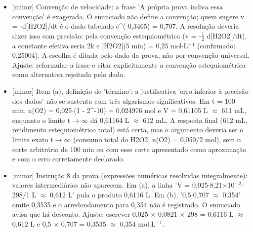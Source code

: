 \documentclass{article}%
\begin{document}
\begin{itemize}%
\item%
{[}minor{]} Convenção de velocidade: a frase 'A própria prova indica essa convenção' é exagerada. O enunciado não define a convenção; quem sugere v = -d{[}H2O2{]}/dt é o dado tabelado e\^{}(-0,3465) = 0,707. A resolução deveria dizer isso com precisão: pela convenção estequiométrica (v = -$\frac12$ d{[}H2O2{]}/dt), a constante efetiva seria 2k e {[}H2O2{]}(5 min) = 0,25 mol$\cdot$L$^{-}$$^{1}$ (confirmado: 0,25004). A escolha é ditada pelo dado da prova, não por convenção universal. Ajuste: reformular a frase e citar explicitamente a convenção estequiométrica como alternativa rejeitada pelo dado.%
\item%
{[}minor{]} Item (a), definição de 'término': a justificativa 'erro inferior à precisão dos dados' não se sustenta com três algarismos significativos. Em t = 100 min, n(O2) = 0,025$\cdot$(1 - 2\^{}-10) = 0,024976 mol e V = 0,61105 L $\approx$ 611 mL, enquanto o limite t$\to$$\infty$ dá 0,61164 L $\approx$ 612 mL. A resposta final (612 mL, rendimento estequiométrico total) está certa, mas o argumento deveria ser o limite exato t$\to$$\infty$ (consumo total do H2O2, n(O2) = 0,050/2 mol), sem o corte arbitrário de 100 min ou com esse corte apresentado como aproximação e com o erro corretamente declarado.%
\item%
{[}minor{]} Instrução 8 da prova (expressões numéricas resolvidas integralmente): valores intermediários não aparecem. Em (a), a linha 'V = 0,025$\cdot$8,21$\times$10$^{-}$$^2$$\cdot$298/1 L $\approx$ 0,612 L' pula o produto 0,6116 L. Em (b), '0,5$\cdot$0,707 $\approx$ 0,354' omite 0,3535 e o arredondamento para 0,354 não é registrado. O enunciado avisa que há desconto. Ajuste: escrever 0,025 $\times$ 0,0821 $\times$ 298 = 0,6116 L $\approx$ 0,612 L e 0,5 $\times$ 0,707 = 0,3535 $\approx$ 0,354 mol$\cdot$L$^{-}$$^{1}$.%
\end{itemize}%
\end{document}
